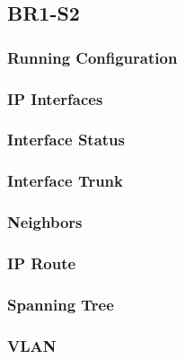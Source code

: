 \subsection{BR1-S2}
\subsubsection{Running Configuration}


\subsubsection{IP Interfaces}


\subsubsection{Interface Status}


\subsubsection{Interface Trunk}


\subsubsection{Neighbors}


\subsubsection{IP Route}


\subsubsection{Spanning Tree}


\subsubsection{VLAN}





